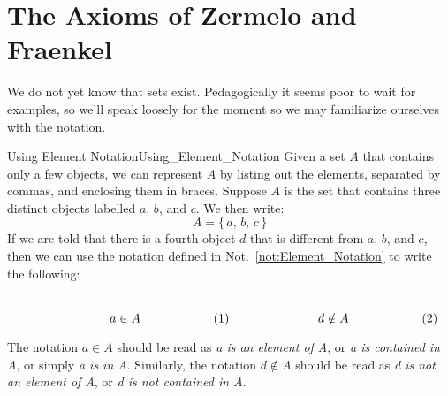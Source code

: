 \section{The Axioms of Zermelo and Fraenkel}
    We do not yet know that sets exist. Pedagogically it seems poor to wait
    for examples, so we'll speak loosely for the moment so we may familiarize
    ourselves with the notation.
    \newpage
    \begin{fexample}{Using Element Notation}{Using_Element_Notation}
        Given a set $A$ that contains only a few objects, we can represent $A$
        by listing out the elements, separated by commas, and enclosing them in
        braces. Suppose $A$ is the set that contains three distinct objects
        labelled $a$, $b$, and $c$. We then write:
        \begin{equation}
            A=\big\{\,a,\,b,\,c\,\big\}
        \end{equation}
        If we are told that there is a fourth object $d$ that is different from
        $a$, $b$, and $c$, then we can use the notation defined in
        Not.~\ref{not:Element_Notation} to write the following:
        \par
        \begin{subequations}
            \begin{minipage}[b]{0.49\textwidth}
                \centering
                \begin{equation}
                    a\in{A}
                \end{equation}
            \end{minipage}
            \hfill
            \begin{minipage}[b]{0.49\textwidth}
                \centering
                \begin{equation}
                    d\notin{A}
                \end{equation}
            \end{minipage}
        \end{subequations}
        \par\vspace{2.5ex}
        The notation $a\in{A}$ should be read as \textit{a is an element of A},
        or \textit{a is contained in A}, or simply \textit{a is in A}.
        Similarly, the notation $d\notin{A}$ should be read as
        \textit{d is not an element of A}, or \textit{d is not contained in A}.
        \par\hfill\par

\end{fexample}
